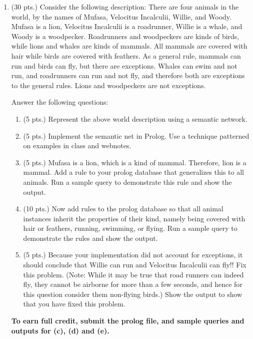 \documentclass{article}%
\begin{document}
\begin{enumerate}
 	\item (30 pts.) Consider the following description: There are four animals in the world, by the names of Mufasa, Velocitus Incalculii, Willie, and Woody. Mufasa is a lion, Velocitus Incalculii is a roadrunner, Willie is a whale, and Woody is a woodpecker. Roadrunners and woodpeckers are kinds of birds, while lions and whales are kinds of mammals. All mammals are covered with hair while birds are covered with feathers. As a general rule, mammals can run and birds can fly, but there are exceptions. Whales can swim and not run, and roadrunners can run and not fly, and therefore both are exceptions to the general rules. Lions and woodpeckers are not exceptions. 

Answer the following questions:
	\begin{enumerate}
		\item (5 pts.) Represent the above world description using a semantic network.
		\item (5 pts.) Implement the semantic net in Prolog. Use a technique patterned on examples in class and webnotes.
		\item (5 pts.) Mufasa is a lion, which is a kind of mammal. Therefore, lion is a mammal. Add a rule to your prolog database that generalizes this to all animals. Run a sample query to demonstrate this rule and show the output.
		\item (10 pts.) Now add rules to the prolog database so that all animal instances inherit the properties of their kind, namely being covered with hair or feathers, running, swimming, or flying. Run a sample query to demonstrate the rules and show the output.
		\item (5 pts.) Because your implementation did not account for exceptions, it should conclude that Willie can run and Velocitus Incalculii can fly!! Fix this problem. (Note: While it may be true that road runners can indeed fly, they cannot be airborne for more than a few seconds, and hence for this question consider them non-flying birds.) Show the output to show that you have fixed this problem.
\end{enumerate}

\textbf{To earn full credit, submit the prolog file, and sample queries and outputs for (c), (d) and (e).}


\end{enumerate}
\end{document}
